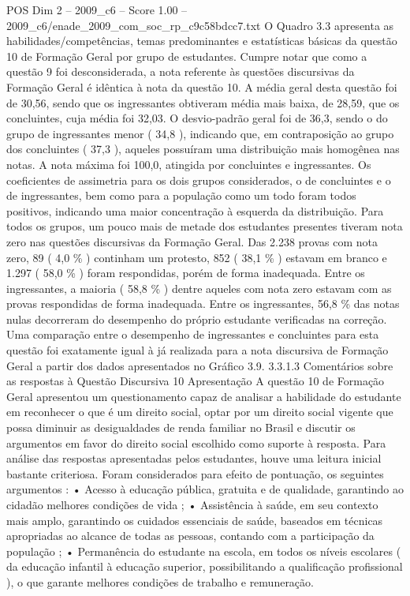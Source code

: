 \begin{textsample}{POS Dim 2 – 2009\_c6 – Score 1.00 – 2009\_c6/enade\_2009\_com\_soc\_rp\_c9c58bdcc7.txt}
O Quadro 3.3 apresenta as habilidades/competências, temas predominantes e estatísticas básicas da questão 10 de Formação Geral por grupo de estudantes.
Cumpre notar que como a questão 9 foi desconsiderada, a nota referente às questões discursivas da Formação Geral é idêntica à nota da questão 10.
A média geral desta questão foi de 30,56, sendo que os ingressantes obtiveram média mais baixa, de 28,59, que os concluintes, cuja média foi 32,03.
O desvio-padrão geral foi de 36,3, sendo o do grupo de ingressantes menor ( 34,8 ), indicando que, em contraposição ao grupo dos concluintes ( 37,3 ), aqueles possuíram uma distribuição mais homogênea nas notas.
A nota máxima foi 100,0, atingida por concluintes e ingressantes.
Os coeficientes de assimetria para os dois grupos considerados, o de concluintes e o de ingressantes, bem como para a população como um todo foram todos positivos, indicando uma maior concentração à esquerda da distribuição.
Para todos os grupos, um pouco mais de metade dos estudantes presentes tiveram nota zero nas questões discursivas da Formação Geral.
Das 2.238 provas com nota zero, 89 ( 4,0 \% ) continham um protesto, 852 ( 38,1 \% ) estavam em branco e 1.297 ( 58,0 \% ) foram respondidas, porém de forma inadequada.
Entre os ingressantes, a maioria ( 58,8 \% ) dentre aqueles com nota zero estavam com as provas respondidas de forma inadequada.
Entre os ingressantes, 56,8 \% das notas nulas decorreram do desempenho do próprio estudante verificadas na correção.
Uma comparação entre o desempenho de ingressantes e concluintes para esta questão foi exatamente igual à já realizada para a nota discursiva de Formação Geral a partir dos dados apresentados no Gráfico 3.9. 3.3.1.3 Comentários sobre as respostas à Questão Discursiva 10 Apresentação A questão 10 de Formação Geral apresentou um questionamento capaz de analisar a habilidade do estudante em reconhecer o que é um direito social, optar por um direito social vigente que possa diminuir as desigualdades de renda familiar no Brasil e discutir os argumentos em favor do direito social escolhido como suporte à resposta.
Para análise das respostas apresentadas pelos estudantes, houve uma leitura inicial bastante criteriosa.
Foram considerados para efeito de pontuação, os seguintes argumentos : • Acesso à educação pública, gratuita e de qualidade, garantindo ao cidadão melhores condições de vida ; • Assistência à saúde, em seu contexto mais amplo, garantindo os cuidados essenciais de saúde, baseados em técnicas apropriadas ao alcance de todas as pessoas, contando com a participação da população ; • Permanência do estudante na escola, em todos os níveis escolares ( da educação infantil à educação superior, possibilitando a qualificação profissional ), o que garante melhores condições de trabalho e remuneração.

\end{textsample}
